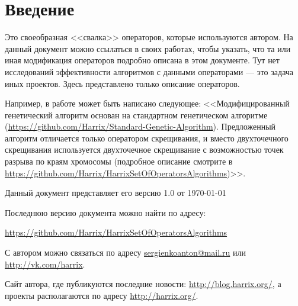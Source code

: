 \section{Введение}

Это своеобразная <<свалка>> операторов, которые используются автором. На данный документ можно ссылаться в своих работах, чтобы указать, что та или иная модификация операторов подробно описана в этом документе. Тут нет исследований эффективности алгоритмов с данными операторами --- это задача иных проектов. Здесь представлено только описание операторов.

Например, в работе может быть написано следующее: <<Модифицированный генетический алгоритм основан на стандартном генетическом алгоритме (\href{https://github.com/Harrix/Standard-Genetic-Algorithm}{https://github.com/Harrix/Standard-Genetic-Algorithm}). Предложенный алгоритм отличается только оператором скрещивания, и вместо двухточечного скрещивания используется двухточечное скрещивание с возможностью точек разрыва по краям хромосомы (подробное описание смотрите в \href{https://github.com/Harrix/HarrixSetOfOperatorsAlgorithms}{https://github.com/Harrix/HarrixSetOfOperatorsAlgorithms})>>.

Данный документ представляет его версию 1.0 от \today

Последнюю версию документа можно найти по адресу:

\href{https://github.com/Harrix/HarrixSetOfOperatorsAlgorithms}{https://github.com/Harrix/HarrixSetOfOperatorsAlgorithms}

С автором можно связаться по адресу \href{mailto:sergienkoanton@mail.ru}{sergienkoanton@mail.ru} или  \href{http://vk.com/harrix}{http://vk.com/harrix}.

Сайт автора, где публикуются последние новости: \href{http://blog.harrix.org/}{http://blog.harrix.org/}, а проекты располагаются по адресу \href{http://harrix.org/}{http://harrix.org/}.